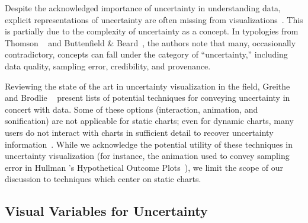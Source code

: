 
Despite the acknowledged importance of uncertainty in understanding data, explicit representations of uncertainty are often missing from visualizations~\cite{boukhelifa2009uncertainty}. This is partially due to the complexity of uncertainty as a concept. In typologies from Thomson \ea~\cite{thomson2005typology} and Buttenfield \& Beard~\cite{buttenfield1994graphical}, the authors note that many, occasionally contradictory, concepts can fall under the category of ``uncertainty,'' including data quality, sampling error, credibility, and provenance.


Reviewing the state of the art in uncertainty visualization in the field, Greithe \ea~\cite{griethe2006visualization} and Brodlie \ea~\cite{brodlie2012review} present lists of potential techniques for conveying uncertainty in concert with data. Some of these options (interaction, animation, and sonification) are not applicable for static charts; even for dynamic charts, many users do not interact with charts in sufficient detail to recover uncertainty information~\cite{nyt2016}. While we acknowledge the potential utility of these techniques in uncertainty visualization (for instance, the animation used to convey sampling error in Hullman \ea's Hypothetical Outcome Plots~\cite{hullman2015hypothetical}), we limit the scope of our discussion to techniques which center on static charts.

\subsection{Visual Variables for Uncertainty}

